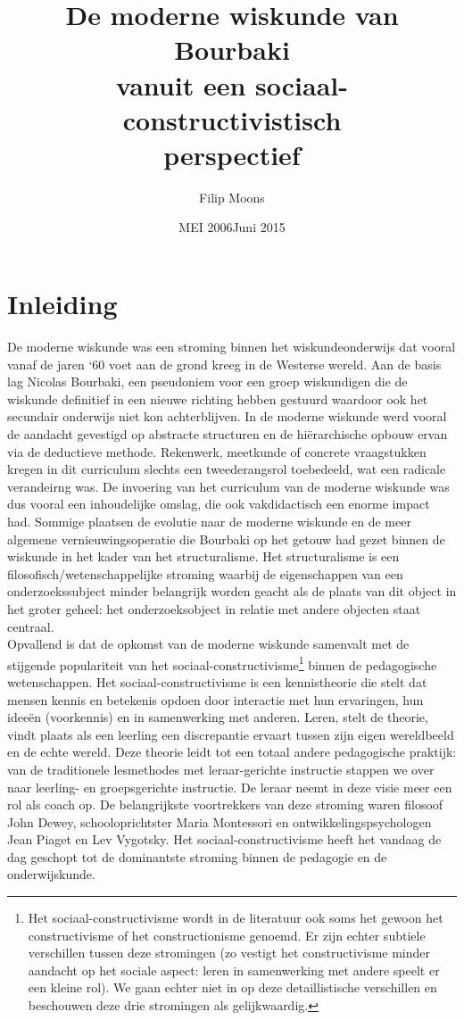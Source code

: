 \documentclass[a4paper,11pt]{article}
\author{Filip Moons}
\title{De moderne wiskunde van Bourbaki \\vanuit een sociaal-constructivistisch \\perspectief}
\date{MEI 2006}
\date{Juni 2015}
\begin{document}
\maketitlepage


\tableofcontents
\newpage
\section{Inleiding}
De moderne wiskunde was een stroming binnen het wiskundeonderwijs dat vooral 
vanaf de jaren `60 voet aan de grond kreeg in de Westerse wereld. Aan de basis lag 
Nicolas Bourbaki, een pseudoniem voor een groep wiskundigen die de wiskunde 
definitief in een nieuwe richting hebben gestuurd waardoor ook het secundair onderwijs niet kon achterblijven. In de moderne
wiskunde werd vooral de aandacht gevestigd op abstracte structuren en de hiërarchische opbouw ervan via de deductieve methode.
Rekenwerk, meetkunde of concrete vraagstukken kregen in dit curriculum slechts een tweederangsrol toebedeeld, wat een radicale verandeirng was. 
De invoering van het curriculum van de moderne wiskunde was dus vooral een inhoudelijke omslag, die ook vakdidactisch een enorme impact had.
Sommige plaatsen de evolutie naar de moderne wiskunde en de meer algemene vernieuwingsoperatie die Bourbaki op het getouw had gezet binnen de wiskunde
in het kader van het structuralisme. Het structuralisme is een filosofisch/wetenschappelijke stroming waarbij de eigenschappen van een onderzoekssubject 
minder belangrijk worden geacht als de plaats van dit object in het groter geheel: het onderzoeksobject in relatie met andere objecten staat centraal.  \\

\noindent Opvallend is dat de opkomst van
de moderne wiskunde samenvalt met de stijgende populariteit van het 
sociaal-constructivisme\footnote{Het sociaal-constructivisme wordt in de literatuur ook soms het gewoon het constructivisme of het constructionisme genoemd. Er zijn echter
subtiele verschillen tussen deze stromingen (zo vestigt het constructivisme minder aandacht op het sociale aspect: leren in samenwerking met andere speelt er een kleine rol). We gaan echter niet in op deze detaillistische verschillen en beschouwen deze
drie stromingen als gelijkwaardig.} binnen de pedagogische wetenschappen. Het 
sociaal-constructivisme is een kennistheorie die stelt dat mensen kennis en 
betekenis opdoen door interactie met hun ervaringen, hun ideeën (voorkennis) en in 
samenwerking met anderen. Leren, stelt de theorie, vindt plaats als een leerling een discrepantie ervaart tussen zijn 
eigen wereldbeeld en de echte wereld. Deze theorie leidt tot een totaal andere pedagogische 
praktijk: van de traditionele lesmethodes met leraar-gerichte instructie stappen we over naar
leerling- en groepsgerichte instructie. De leraar neemt in deze visie meer een rol als coach op. De 
belangrijkste voortrekkers van deze stroming waren filosoof John Dewey, schooloprichtster Maria 
Montessori en ontwikkelingspsychologen Jean Piaget en Lev Vygotsky. Het sociaal-constructivisme heeft het vandaag de dag 
geschopt tot de dominantste stroming binnen de pedagogie en de onderwijskunde.\\
\end{document}
